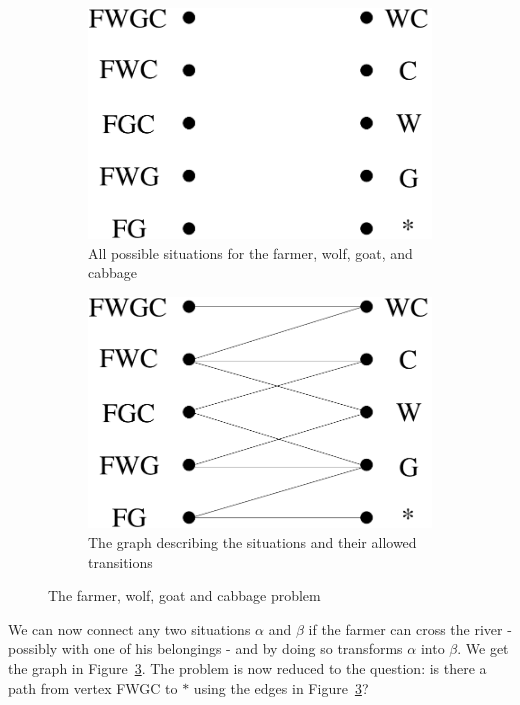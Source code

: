 \begin{figure}[ht]
	\centering
	\begin{subfigure}{0.42\linewidth}
		\centering
		\includegraphics[height=0.12\textheight,keepaspectratio]{BWGK1eng}
		\caption{All possible situations for the farmer, wolf, goat, and cabbage}
		\label{BWGK1}
	\end{subfigure}\qquad\qquad
	\begin{subfigure}{0.42\linewidth}
		\centering
		\includegraphics[height=0.12\textheight,keepaspectratio]{BWGK2eng} 
		\caption{The graph describing the situations and their allowed transitions}
		\label{BWGK2}
	\end{subfigure}
	\caption{The farmer, wolf, goat and cabbage problem}
\end{figure}

We can now connect any two situations $\alpha$ and $\beta$ if the
farmer can cross the river - possibly with one of his belongings - and
by doing so transforms $\alpha$ into $\beta$. We get the graph in
Figure~\ref{BWGK2}.  The problem is now reduced to the question: is
there a path from vertex FWGC to $\ast$ using the edges in
Figure~\ref{BWGK2}?

